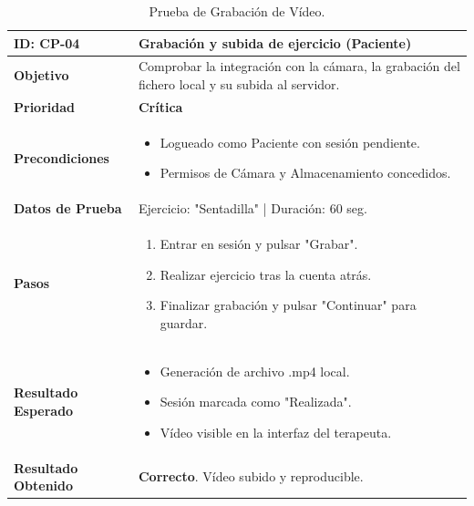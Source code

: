 \begin{table}[H]
    \centering
    \begin{tabularx}{\textwidth}{|l|X|}
        \hline
        \rowcolor{gray!25} \textbf{ID: CP-04} & \textbf{Grabación y subida de ejercicio (Paciente)} \\ \hline
        \textbf{Objetivo} & Comprobar la integración con la cámara, la grabación del fichero local y su subida al servidor. \\ \hline
        \textbf{Prioridad} & \textbf{Crítica} \\ \hline
        \textbf{Precondiciones} & 
        \vspace*{-\baselineskip}
        \begin{itemize}
            \item Logueado como Paciente con sesión pendiente.
            \item Permisos de Cámara y Almacenamiento concedidos.
        \end{itemize} \\ \hline
        \textbf{Datos de Prueba} & Ejercicio: "Sentadilla" | Duración: 60 seg. \\ \hline
        \textbf{Pasos} & 
        \vspace*{-\baselineskip}
        \begin{enumerate}
            \item Entrar en sesión y pulsar "Grabar".
            \item Realizar ejercicio tras la cuenta atrás.
            \item Finalizar grabación y pulsar "Continuar" para guardar.
        \end{enumerate} \\ \hline
        \textbf{Resultado Esperado} & 
        \vspace*{-\baselineskip}
        \begin{itemize}
            \item Generación de archivo .mp4 local.
            \item Sesión marcada como "Realizada".
            \item Vídeo visible en la interfaz del terapeuta.
        \end{itemize} \\ \hline
        \textbf{Resultado Obtenido} & \textcolor{green!40!black}{\textbf{Correcto}}. Vídeo subido y reproducible. \\ \hline
    \end{tabularx}
    \caption{Prueba de Grabación de Vídeo.}
\end{table}

